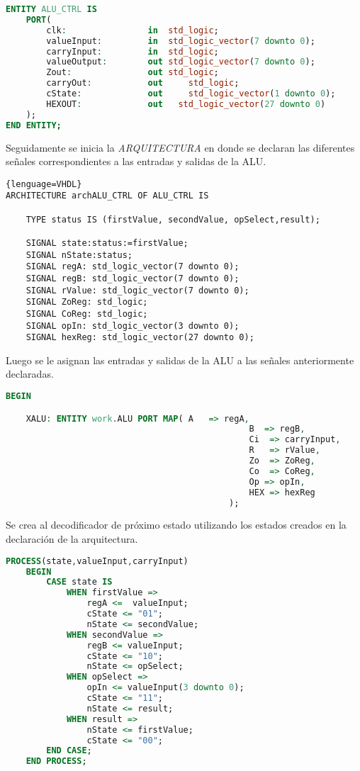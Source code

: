 \documentclass[12pt, letterpaper]{IEEEtran}
\begin{document}
\begin{lstlisting}[language=VHDL]
ENTITY ALU_CTRL IS
	PORT(
		clk:				in 	std_logic;								
		valueInput:			in 	std_logic_vector(7 downto 0);		
		carryInput: 		in 	std_logic;								
		valueOutput:		out	std_logic_vector(7 downto 0);		
		Zout:				out	std_logic;							
		carryOut:			out 	std_logic;								
		cState:				out 	std_logic_vector(1 downto 0);
		HEXOUT:				out   std_logic_vector(27 downto 0)    
	);
END ENTITY;
\end{lstlisting}

\indent Seguidamente se inicia la \textit{ARQUITECTURA} en donde se declaran las diferentes señales correspondientes a las entradas y salidas de la ALU.\\

\begin{lstlisting}{lenguage=VHDL}
ARCHITECTURE archALU_CTRL OF ALU_CTRL IS
	
	TYPE status IS (firstValue, secondValue, opSelect,result);
	
	SIGNAL state:status:=firstValue;
	SIGNAL nState:status;
	SIGNAL regA: std_logic_vector(7 downto 0);
	SIGNAL regB: std_logic_vector(7 downto 0);
	SIGNAL rValue: std_logic_vector(7 downto 0);
	SIGNAL ZoReg: std_logic;
	SIGNAL CoReg: std_logic;
	SIGNAL opIn: std_logic_vector(3 downto 0);
	SIGNAL hexReg: std_logic_vector(27 downto 0);
\end{lstlisting}

\indent Luego se le asignan las entradas y salidas de la ALU a las señales anteriormente declaradas.\\

\begin{lstlisting}[language=VHDL]
BEGIN

	XALU: ENTITY work.ALU PORT MAP(	A	=> regA,
												B  => regB,
												Ci	=> carryInput,
												R	=> rValue,
												Zo	=> ZoReg,
												Co	=> CoReg,
												Op => opIn,
												HEX => hexReg
											);
\end{lstlisting}

\indent Se crea al decodificador de próximo estado utilizando los estados creados en la declaración de la arquitectura.\\

\begin{lstlisting}[language=VHDL]		
	PROCESS(state,valueInput,carryInput)
	BEGIN
		CASE state IS
			WHEN firstValue =>
				regA <=  valueInput;
				cState <= "01";
				nState <= secondValue;
			WHEN secondValue =>
				regB <= valueInput;
				cState <= "10";
				nState <= opSelect;
			WHEN opSelect =>
				opIn <= valueInput(3 downto 0);
				cState <= "11";
				nState <= result;
			WHEN result =>
				nState <= firstValue;
				cState <= "00";
		END CASE;
	END PROCESS;
\end{lstlisting}
\end{document}
